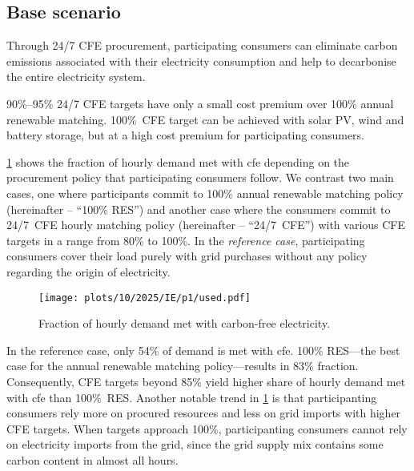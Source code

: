 \subsection{Base scenario}
\label{subsec:base}

\begin{res}
    Through 24/7 CFE procurement, participating consumers can eliminate carbon emissions associated with their electricity consumption and help to decarbonise the entire electricity system.
\end{res}

\begin{res}
    90\%--95\% 24/7 CFE targets have only a small cost premium over 100\% annual renewable matching. 100\%~CFE target can be achieved with solar PV, wind and battery storage, but at a high cost premium for participating consumers.
\end{res}

\cref{fig:10-2025-IE-p1-used} shows the fraction of hourly demand met with \gls{cfe} depending on the procurement policy that participating consumers follow.
We contrast two main cases, one where participants commit to 100\% annual renewable matching policy (hereinafter -- \enquote{100\% RES}) and another case where the consumers commit to 24/7~CFE hourly matching policy (hereinafter -- \enquote{24/7~CFE}) with various CFE targets in a range from 80\% to 100\%. 
In the \textit{reference case}, participating consumers cover their load purely with grid purchases without any policy regarding the origin of electricity.

\begin{figure}
    \centering
    \texttt{[image: plots/10/2025/IE/p1/used.pdf]}
    \caption{Fraction of hourly demand met with carbon-free electricity.}
    \label{fig:10-2025-IE-p1-used}
\end{figure}

In the reference case, only 54\% of demand is met with \gls{cfe}.
100\% RES---the best case for the annual renewable matching policy---results in 83\% fraction. 
Consequently, CFE targets beyond 85\% yield higher share of hourly demand met with \gls{cfe} than 100\%~RES.
Another notable trend in \cref{fig:10-2025-IE-p1-used} is that participanting consumers rely more on procured resources and less on grid imports with higher CFE targets.
When targets approach 100\%, participanting consumers cannot rely on electricity imports from the grid, since the grid supply mix contains some carbon content in almost all hours.


